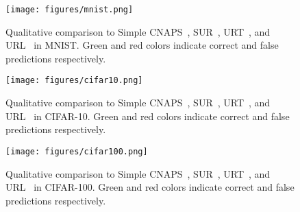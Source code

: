 \begin{figure}[h!]
\begin{center}
\texttt{[image: figures/mnist.png]}
\end{center}
\vspace{-0.3in}
\caption{Qualitative comparison to Simple CNAPS~\cite{bateni2020improved}, SUR~\cite{dvornik2020selecting}, URT~\cite{liu2020universal}, and URL~\cite{li2021universal} in MNIST. Green and red colors indicate correct and false predictions respectively.}
\label{suppfig:mnist}
\end{figure}

\begin{figure}[h!]
\begin{center}
\texttt{[image: figures/cifar10.png]}
\end{center}
\vspace{-0.3in}
\caption{Qualitative comparison to Simple CNAPS~\cite{bateni2020improved}, SUR~\cite{dvornik2020selecting}, URT~\cite{liu2020universal}, and URL~\cite{li2021universal} in CIFAR-10. Green and red colors indicate correct and false predictions respectively.}
\label{suppfig:cifar10}
\end{figure}

\begin{figure}[h!]
\begin{center}
\texttt{[image: figures/cifar100.png]}
\end{center}
\vspace{-0.3in}
\caption{Qualitative comparison to Simple CNAPS~\cite{bateni2020improved}, SUR~\cite{dvornik2020selecting}, URT~\cite{liu2020universal}, and URL~\cite{li2021universal} in CIFAR-100. Green and red colors indicate correct and false predictions respectively.}
\label{suppfig:cifar100}
\end{figure}

